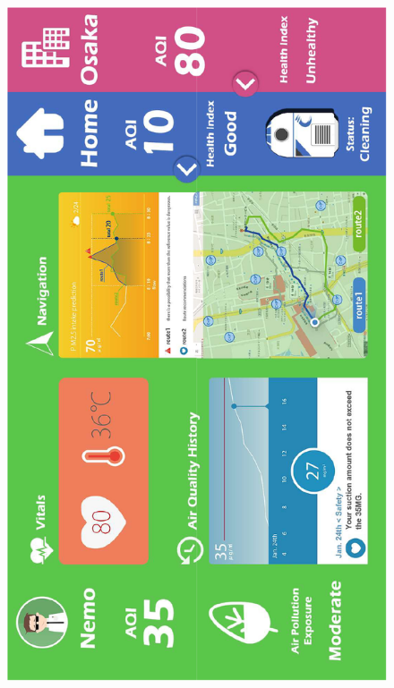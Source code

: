 \begin{figure}[H]
 \centering
 \includegraphics[height=0.9\linewidth, page=6, angle=-90]{pdf/robotic_design.pdf}
\end{figure} 